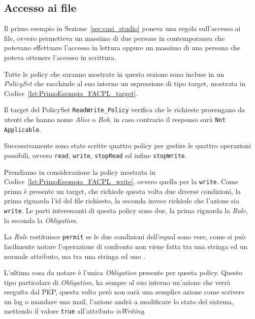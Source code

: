 \subsection{Accesso ai file} %
\label{ssub:primo_esempio}
Il primo esempio in Sezione~\ref{sec:casi_studio} poneva una regola sull'accesso ai file, ovvero permetteva un massimo di due persone in contemporanea che potevano effettuare l'accesso in lettura oppure un massimo di una persona che poteva ottenere l'accesso in scrittura. \par
Tutte le policy che saranno mostrate in questa sezione sono incluse in un \textit{PolicySet} che racchiude al suo interno un espressione di tipo target, mostrata in Codice~\ref{lst:PrimoEsempio_FACPL_target}.

Il target del PolicySet \texttt{ReadWrite\_Policy} verifica che le richieste provengano da utenti che hanno nome \textit{Alice} o \textit{Bob}, in caso contrario il responso sarà \texttt{Not Applicable}. \par
Successivamente sono state scritte quattro policy per gestire le quattro operazioni possibili, ovvero \texttt{read}, \texttt{write}, \texttt{stopRead} ed infine \texttt{stopWrite}. \par
Prendiamo in considerazione la policy mostrata in Codice~\ref{lst:PrimoEsempio_FACPL_write}, ovvero quella per la \texttt{write}. Come prima è presente un target, che richiede questa volta due diverse condizioni, la prima riguarda l'id del file richiesto, la seconda invece richiede che l'azione sia \texttt{write}. Le parti interessanti di questa policy sono due, la prima riguarda la \textit{Rule}, la seconda la \textit{Obligation}. \par
La \textit{Rule} restituisce \texttt{permit} se le due condizioni dell'equal sono vere, come si può facilmente notare l'operazione di confronto non viene fatta tra una stringa ed un normale attributo, ma tra una stringa ed uno \statusattribute. \par
L'ultima cosa da notare è l'unica \textit{Obligation} presente per questa policy. Questo tipo particolare di \textit{Obligation}, ha sempre al suo interno un'azione che verrà eseguita dal PEP, questa volta però non sarà una semplice azione come scrivere un log o mandare una mail, l'azione andrà a modificare lo stato del sistema, mettendo il valore \texttt{true} all'attributo \textit{isWriting}.

